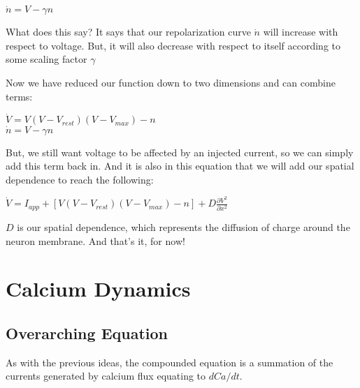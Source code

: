 \documentclass[12pt]{amsart}
\begin{document}
\bigskip

\begin{center}

    $\dot{n} = V - \gamma n$
    
\end{center}

\bigskip

What does this say? It says that our repolarization curve $\dot{n}$ will increase with respect to voltage. But, it will also decrease with respect to itself according to some scaling factor $\gamma$\newline

Now we have reduced our function down to two dimensions and can combine terms: 

\bigskip

\begin{center}

    $\dot{V} = V(V - V_{rest})(V - V_{max}) - n$\\
    $\dot{n} = V - \gamma n$
    
\end{center}

\bigskip

But, we still want voltage to be affected by an injected current, so we can simply add this term back in. And it is also in this equation that we will add our spatial dependence to reach the following: 

\bigskip

\begin{center}

    $\dot{V} = I_{app} + [V(V - V_{rest})(V - V_{max}) - n] +  D\frac{\partial V^2}{\partial x^2}$\\
    
\end{center}

\bigskip

$D$ is our spatial dependence, which represents the diffusion of charge around the neuron membrane. And that's it, for now! 

\section{Calcium Dynamics}

\subsection{Overarching Equation} As with the previous ideas, the compounded equation is a summation of the currents generated by calcium flux equating to $dCa / dt$.\newline
\end{document}
